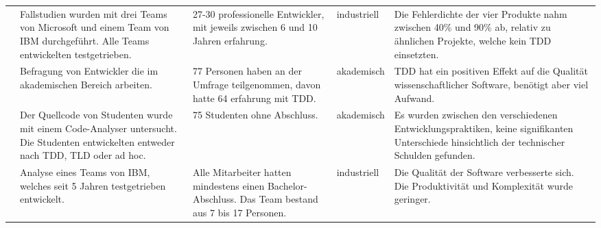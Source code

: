 \begin{table*}[t]
\begin{tabularx}{\textwidth}{@{}Xp{}p{}p{}p{}@{}}
\cite{Nagappan2008RealizingTeams}            & Fallstudien wurden mit drei Teams von Microsoft und einem Team von IBM durchgeführt. Alle Teams entwickelten testgetrieben.                                                                                                              & 27-30 professionelle Entwickler, mit jeweils zwischen 6 und 10 Jahren erfahrung.                                                                               & industriell               & Die Fehlerdichte der vier Produkte nahm zwischen 40\% und 90\% ab, relativ zu ähnlichen Projekte, welche kein TDD einsetzten.                                                                                                                                   \\
\cite{Nanthaamornphong2015Test-DrivenSurvey} & Befragung von Entwickler die im akademischen Bereich arbeiten.                                                                                                                                                                           & 77 Personen haben an der Umfrage teilgenommen, davon hatte 64 erfahrung mit TDD.                                                                               & akademisch                & TDD hat ein positiven Effekt auf die Qualität wissenschaftlicher Software, benötigt aber viel Aufwand.                                                                                                                                                          \\
\cite{Parodi2016ComparingProgramming}        & Der Quellcode von Studenten wurde mit einem Code-Analyser untersucht. Die Studenten entwickelten entweder nach TDD, TLD oder ad hoc.                                                                                                     & 75 Studenten ohne Abschluss.                                                                                                                                   & akademisch                & Es wurden zwischen den verschiedenen Entwicklungspraktiken, keine signifikanten Unterschiede hinsichtlich der technischer Schulden gefunden.                                                                                                                    \\
\cite{Sanchez2007OnIBM}                      & Analyse eines Teams von IBM, welches seit 5 Jahren testgetrieben entwickelt.                                                                                                                                                             & Alle Mitarbeiter hatten mindestens einen Bachelor-Abschluss. Das Team bestand aus 7 bis 17 Personen.                                                           & industriell               & Die Qualität der Software verbesserte sich. Die Produktivität und Komplexität wurde geringer.                                                                                                                                                                   \\

\end{tabularx}
\end{table*}
